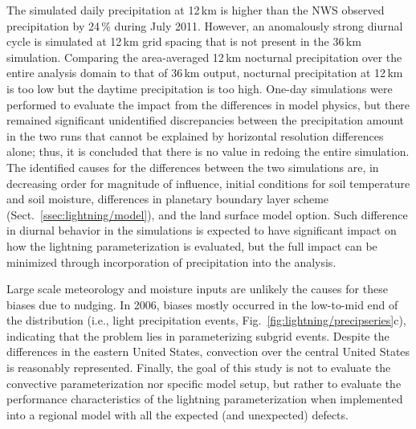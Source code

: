 The simulated daily precipitation at 12\,\unit{km} is higher than the NWS
observed precipitation by 24\,{\%} during July 2011. However, an anomalously
strong diurnal cycle is simulated at 12\,\unit{km} grid spacing that is not
present in the 36\,\unit{km} simulation. Comparing the area-averaged
12\,\unit{km} nocturnal precipitation over the entire analysis domain to that
of 36\,\unit{km} output, nocturnal precipitation at 12\,\unit{km} is too low
but the daytime precipitation is too high. One-day simulations were
performed to evaluate the impact from the differences in model physics, but
there remained significant unidentified discrepancies between the
precipitation amount in the two runs that cannot be explained by horizontal
resolution differences alone; thus, it is concluded that there is no value in
redoing the entire simulation. The identified causes for the differences
between the two simulations are, in decreasing order for magnitude of
influence, initial conditions for soil temperature and soil moisture,
differences in planetary boundary layer scheme (Sect.~\ref{ssec:lightning/model}), and
the land surface model option. Such difference in diurnal behavior in the
simulations is expected to have significant impact on how the lightning
parameterization is evaluated, but the full impact can be minimized through
incorporation of precipitation into the analysis.

Large scale meteorology and moisture inputs are unlikely the causes for
these biases due to nudging. In 2006, biases mostly occurred in the
low-to-mid end of the distribution (i.e., light precipitation events,
Fig.~\ref{fig:lightning/precipseries}c), indicating that the problem lies in
parameterizing subgrid events. Despite the differences in the eastern United
States, convection over the central United States is reasonably represented.
Finally, the goal of this study is not to evaluate the convective
parameterization nor specific model setup, but rather to evaluate the
performance characteristics of the lightning parameterization when
implemented into a regional model with all the expected (and unexpected)
defects.


